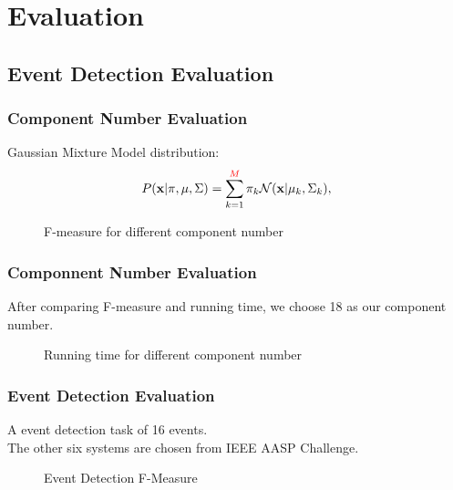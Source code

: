 \documentclass[xcolor=table,slidestop,compress,mathserif]{beamer}
\begin{document}
\section{Evaluation}
\subsection{Event Detection Evaluation}
\begin{frame}
	\frametitle{Component Number Evaluation}
	Gaussian Mixture Model distribution: \\ 
	\begin{equation}
	P(\mathbf{x}|\mathbf{\pi},\mathbf{\mu},\Sigma) = \sum_{k = 1}^{\textcolor{red}{M}} \pi_k
	\mathcal{N}(\mathbf{x}|\mathbf{\mu}_k, \Sigma_k),
	\end{equation} 

	\begin{figure}[htb!]
	\centering
	\resizebox{0.75\totalheight}{!}{}
	\caption{F-measure for different component number}
	\label{fig:component}
	\end{figure}
\end{frame}
\begin{frame}
	\frametitle{Componnent Number Evaluation}
	After comparing F-measure and running time, we choose 18 as our component number. 
	\begin{figure}[htb!]
	\centering
	\resizebox{0.8\totalheight}{!}{}
	\caption{Running time for different component number}
	\label{fig:component}
	\end{figure}
\end{frame}
\begin{frame}
	\frametitle{Event Detection Evaluation}
	A event detection task of 16 events. \\ 
	The other six systems are chosen from IEEE AASP Challenge. 
	\begin{figure}[htb!]
	\centering
	\resizebox{0.8\totalheight}{!}{}
	\caption{Event Detection F-Measure}
	\label{fig:eventdetectF1}
	\end{figure}
\end{frame}
\end{document}
